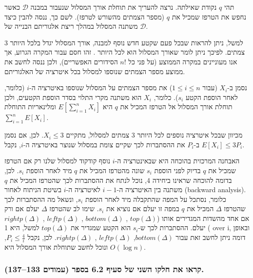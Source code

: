 \documentclass[
]{book}
\begin{document}
תהי \(q\) נקודת שאילתה.
נרצה להעריך את תוחלת אורך המסלול שנעבור במבנה \(\mathcal{D}\) כאשר נחפש את הטרפז שמכיל את \(q\) (מספר הצמתים מהשורש לטרפז).
לשם כך, ננסה להבין כיצד משתנה המסלול במהלך ריצת אלגוריתם הבנייה של \(\mathcal{D}\).

למשל, ניתן להראות שבכל פעם שקטע חדש נוסף למבנה, אורך המסלול יגדל בלכל היותר 3 צמתים.
לפיכך ניתן לומר שאורך המסלול הוא לכל היותר .
זהו חסם עבור המקרה הגרוע, אך אנו מעוניינים במקרה הממוצע (על פני כל \(n!\) הסידורים האפשריים), ולכן ננסה לחשב את ממוצע מספר הצמתים שנוספו למסלול בכל איטרציה של האלגוריתם.

נסמן ב-\(X_i\) (עבור \(1 \le i \le n\)) את מספר הצמתים על המסלול שנוספו באיטרציה ה-\(i\) (כלומר, לאחר הוספת הקטע \(s_i\)).
כלומר, \(X_i\) הוא משתנה מקרי התלוי בסדר הוספת הקטעים, ולכן תוחלת אורך המסלול אל הטרפז המכיל את \(q\) היא \(E[ \sum_{i=1}^{n} X_i ]\) ומלינאריות התוחלת \(\sum_{i=1}^{n} E[X_i]\).

מכיוון שבכל איטרציה נוספים לכל היותר 3 צמתים למסלול, מתקיים \(X_i \le 3\).
לכן, אם נסמן ב-\(P_i\) את ההסתברות לכך שקיים צומת במסלול שנוצר באיטרציה ה-\(i\), נקבל \(E[ X_i ] \le 3 P_i\).

האבחנה המרכזית בהוכחה היא שבאינטרציה ה-\(i\) נוסף קודקוד למסלול שלנו רק אם הטרפז שמכיל את \(q\) בדיוק לפני הוספת \(s_i\) שונה מהטרפז המכיל את \(q\) מיד לאחר הוספת \(s_i\).
לכן, בדומה להוכחה שראינו ביחידה 4, נוכל לנתח את ההסתברות לכך שהטרפז המכיל את \(q\) משתנה בין האיטרציה ה-\(i - 1\) לאיטרציה ה-\(i\) בשיטת הניתוח לאחור (backward analysis).
כלומר, נסתכל על המפה שהתקבלה מיד לאחר הוספת \(s_i\), ונשאל מה ההסתברות לכך שהטרפז \(\Delta\) המכיל את \(q\) במפה זו יעלם אם נוציא את \(s_i\).
שימו לב שהטרפז \(\Delta\) יעלם אם ורק אם אחד מהשדות המגדירים אותו (\(top(\Delta)\) , \(bottom(\Delta)\) , \(leftp(\Delta)\) , \(rightp(\Delta)\)) יעלם.
ההסתברות לכך ש-\(s_i\) הוא הקטע שמגדיר את \(top(\Delta)\) למשל, היא 1 over i, ובאופן דומה ניתן לחשב זאת עבור \(bottom(\Delta)\), \(leftp(\Delta)\) , \(rightp(\Delta)\).
לכן, נקבל \(P_i \le \frac{4}{i}\), ונוכל לחשב שתוחלת אורך המסלול היא \(O (\log n )\).

\hypertarget{ux5e7ux5e8ux5d0ux5d5-ux5d0ux5ea-ux5d7ux5dcux5e7ux5d5-ux5d4ux5e9ux5e0ux5d9-ux5e9ux5dc-ux5e1ux5e2ux5d9ux5e3-6.2-ux5d1ux5e1ux5e4ux5e8-ux5e2ux5deux5d5ux5d3ux5d9ux5dd-133137.}{%
\subsubsection*{קראו את חלקו השני של סעיף 6.2 בספר (עמודים 133--137).}\label{ux5e7ux5e8ux5d0ux5d5-ux5d0ux5ea-ux5d7ux5dcux5e7ux5d5-ux5d4ux5e9ux5e0ux5d9-ux5e9ux5dc-ux5e1ux5e2ux5d9ux5e3-6.2-ux5d1ux5e1ux5e4ux5e8-ux5e2ux5deux5d5ux5d3ux5d9ux5dd-133137.}}
\end{document}
